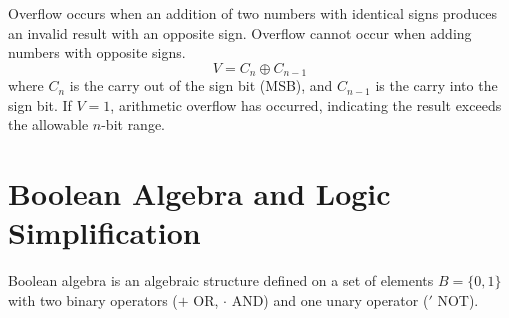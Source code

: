 \documentclass[12pt,a4paper]{article}
\begin{document}
\begin{tcolorbox}[formulabox, title={\textbf{Arithmetic Overflow Rule in 2's Complement}}]
Overflow occurs when an addition of two numbers with identical signs produces an invalid result with an opposite sign. Overflow cannot occur when adding numbers with opposite signs.
\begin{equation}
  V = C_n \oplus C_{n-1}
\end{equation}
where $C_n$ is the carry out of the sign bit (MSB), and $C_{n-1}$ is the carry into the sign bit. If $V = 1$, arithmetic overflow has occurred, indicating the result exceeds the allowable $n$-bit range.
\end{tcolorbox}

\section{Boolean Algebra and Logic Simplification}

Boolean algebra is an algebraic structure defined on a set of elements $B = \{0, 1\}$ with two binary operators ($+$ OR, $\cdot$ AND) and one unary operator ($'$ NOT).
\end{document}

